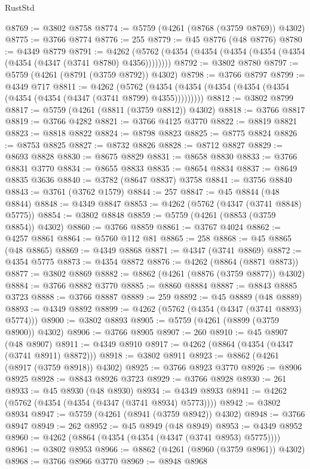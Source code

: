 \begin{lexlean}{RustStd}
\begin{coremodule}
@8769 := @3802 @8758
@8774 := @5759 (@4261 (@8768 (@3759 @8769)) @4302)
@8775 := @3766 @8774
@8776 := 255
@8779 := @45 @8776 (@48 @8776)
@8780 := @4349 @8779
@8791 := @4262 (@5762 (@4354 (@4354 (@4354 (@4354 (@4354 (@4354 (@4347 (@3741 @8780) @4356))))))))
@8792 := @3802 @8780
@8797 := @5759 (@4261 (@8791 (@3759 @8792)) @4302)
@8798 := @3766 @8797
@8799 := @4349 @717
@8811 := @4262
    (@5762 (@4354 (@4354 (@4354 (@4354 (@4354 (@4354 (@4354 (@4347 (@3741 @8799) @4355)))))))))
@8812 := @3802 @8799
@8817 := @5759 (@4261 (@8811 (@3759 @8812)) @4302)
@8818 := @3766 @8817
@8819 := @3766 @4282
@8821 := @3766 @4125 @3770
@8822 := @8819 @8821
@8823 := @8818 @8822
@8824 := @8798 @8823
@8825 := @8775 @8824
@8826 := @8753 @8825
@8827 := @8732 @8826
@8828 := @8712 @8827
@8829 := @8693 @8828
@8830 := @8675 @8829
@8831 := @8658 @8830
@8833 := @3766 @8831 @3770
@8834 := @8655 @8833
@8835 := @8654 @8834
@8837 := @8649 @8835 @3636
@8840 := @3782 (@8647 @8837) @3758
@8841 := @3756 @8840
@8843 := @3761 (@3762 @1579)
@8844 := 257
@8847 := @45 @8844 (@48 @8844)
@8848 := @4349 @8847
@8853 := @4262 (@5762 (@4347 (@3741 @8848) @5775))
@8854 := @3802 @8848
@8859 := @5759 (@4261 (@8853 (@3759 @8854)) @4302)
@8860 := @3766 @8859
@8861 := @3767 @4024
@8862 := @4257 @8861
@8864 := @5760 @112 @81
@8865 := 258
@8868 := @45 @8865 (@48 @8865)
@8869 := @4349 @8868
@8871 := @4347 (@3741 @8869)
@8872 := @4354 @5775
@8873 := @4354 @8872
@8876 := @4262 (@8864 (@8871 @8873))
@8877 := @3802 @8869
@8882 := @8862 (@4261 (@8876 (@3759 @8877)) @4302)
@8884 := @3766 @8882 @3770
@8885 := @8860 @8884
@8887 := @8843 @8885 @3723
@8888 := @3766 @8887
@8889 := 259
@8892 := @45 @8889 (@48 @8889)
@8893 := @4349 @8892
@8899 := @4262 (@5762 (@4354 (@4347 (@3741 @8893) @5774)))
@8900 := @3802 @8893
@8905 := @5759 (@4261 (@8899 (@3759 @8900)) @4302)
@8906 := @3766 @8905
@8907 := 260
@8910 := @45 @8907 (@48 @8907)
@8911 := @4349 @8910
@8917 := @4262 (@8864 (@4354 (@4347 (@3741 @8911) @8872)))
@8918 := @3802 @8911
@8923 := @8862 (@4261 (@8917 (@3759 @8918)) @4302)
@8925 := @3766 @8923 @3770
@8926 := @8906 @8925
@8928 := @8843 @8926 @3723
@8929 := @3766 @8928
@8930 := 261
@8933 := @45 @8930 (@48 @8930)
@8934 := @4349 @8933
@8941 := @4262 (@5762 (@4354 (@4354 (@4347 (@3741 @8934) @5773))))
@8942 := @3802 @8934
@8947 := @5759 (@4261 (@8941 (@3759 @8942)) @4302)
@8948 := @3766 @8947
@8949 := 262
@8952 := @45 @8949 (@48 @8949)
@8953 := @4349 @8952
@8960 := @4262 (@8864 (@4354 (@4354 (@4347 (@3741 @8953) @5775))))
@8961 := @3802 @8953
@8966 := @8862 (@4261 (@8960 (@3759 @8961)) @4302)
@8968 := @3766 @8966 @3770
@8969 := @8948 @8968

\end{coremodule}
\end{lexlean}
